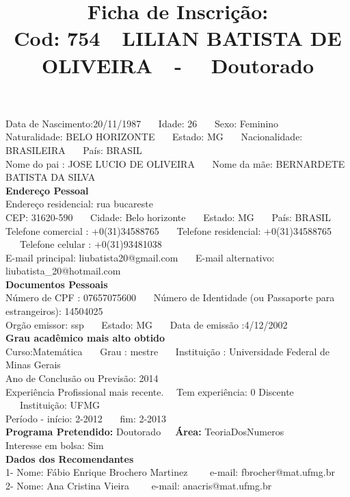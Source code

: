\documentclass[11pt]{article}
\title{\vspace*{-4cm} Ficha de Inscrição: \\Cod: 754\ \ LILIAN BATISTA DE OLIVEIRA\ \ - \ \ Doutorado 
 }
\date{}
\begin{document}
\maketitle
\vspace*{-1.5cm}
\noindent Data de Nascimento:20/11/1987
\ \ \ Idade: 26   \ \ \ Sexo: Feminino
\\
Naturalidade: BELO HORIZONTE  
\ \ \  Estado: MG
\ \ \  Nacionalidade: BRASILEIRA
\ \ \ País: BRASIL
\\        
Nome do pai : JOSE LUCIO DE OLIVEIRA
\ \ \ Nome da mãe: BERNARDETE BATISTA DA SILVA          
\\[0.2cm]                     
\textbf{Endereço Pessoal} 
\\ 
\noindent Endereço residencial: rua bucareste
\\
        CEP: 31620-590 
\ \ \ Cidade: Belo horizonte 
\ \ \ Estado: MG 
\ \ \ País: BRASIL
\\		
		Telefone comercial : +0(31)34588765
\ \ \ Telefone residencial: +0(31)34588765
\ \ \ Telefone celular : +0(31)93481038
\\
E-mail principal: liubatista20@gmail.com
\ \ \ E-mail alternativo: liubatista\_20@hotmail.com 
\\[0.2cm] 
\textbf{Documentos Pessoais}
\\
\noindent Número de CPF : 07657075600
\ \ \ Número de Identidade (ou Passaporte para estrangeiros): 14504025
\\
Orgão emissor: ssp
\ \ \ Estado: MG
\ \ \ Data de emissão :4/12/2002
\\[0.3cm]
\textbf{Grau acadêmico mais alto obtido}
\\	
Curso:Matemática
\ \ \ Grau : mestre
\ \ \ Instituição : Universidade Federal de Minas Gerais
\\			
Ano de Conclusão ou Previsão: 2014
\\ 
Experiência Profissional mais recente. \ \  
Tem experiência: 0 Discente  
\ \ \ Instituição: UFMG
\\  
Período - início: 2-2012
\ \ \ fim: 2-2013
\\[0.2cm] 
\textbf{Programa Pretendido:} Doutorado\ \ \ \textbf{Área:} TeoriaDosNumeros\\
Interesse em bolsa: Sim
\\[0.3cm]		
\textbf{Dados dos Recomendantes} 
\\
1- Nome: Fábio Enrique Brochero Martinez
\ \ \ \  e-mail: fbrocher@mat.ufmg.br 
\\
2- Nome: Ana Cristina Vieira
\ \ \ \ e-mail: anacris@mat.ufmg.br
\end{document}
